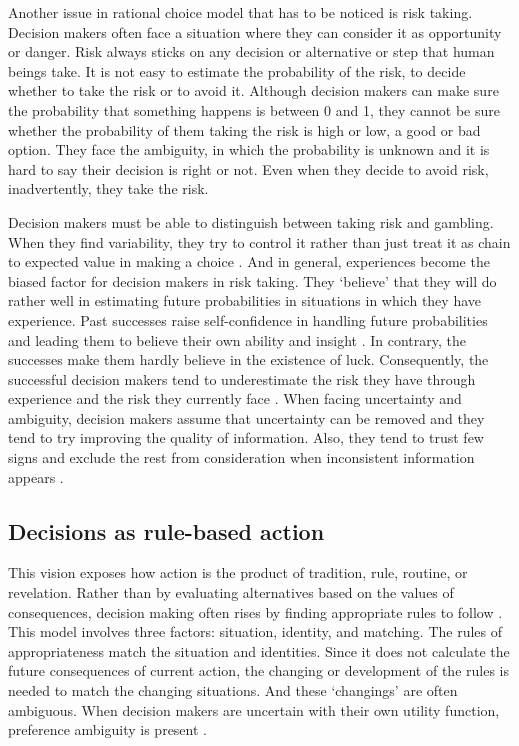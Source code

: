Another issue in rational choice model that has to be noticed is risk taking. Decision makers often face a situation where they can consider it as opportunity or danger. Risk always sticks on any decision or alternative or step that human beings take. It is not easy to estimate the probability of the risk, to decide whether to take the risk or to avoid it. Although decision makers can make sure the probability that something happens is between 0 and 1, they cannot be sure whether the probability of them taking the risk is high or low, a good or bad option. They face the ambiguity, in which the probability is unknown and it is hard to say their decision is right or not. Even when they decide to avoid risk, inadvertently, they take the risk.

Decision makers must be able to distinguish between taking risk and gambling. When they find variability, they try to control it rather than just treat it as chain to expected value in making a choice \cite{7}. And in general, experiences become the biased factor for decision makers in risk taking. They ‘believe’ that they will do rather well in estimating future probabilities in situations in which they have experience. Past successes raise self-confidence in handling future probabilities and leading them to believe their own ability and insight \cite{2}. In contrary, the successes make them hardly believe in the existence of luck. Consequently, the successful decision makers tend to underestimate the risk they have through experience and the risk they currently face \cite{7}. When facing uncertainty and ambiguity, decision makers assume that uncertainty can be removed and they tend to try improving the quality of information. Also, they tend to trust few signs and exclude the rest from consideration when inconsistent information appears \cite{8}.

\subsection{Decisions as rule-based action}

This vision exposes how action is the product of tradition, rule, routine, or revelation. Rather than by evaluating alternatives based on the values of consequences, decision making often rises by finding appropriate rules to follow \cite{2}. This model involves three factors: situation, identity, and matching. The rules of appropriateness match the situation and identities. Since it does not calculate the future consequences of current action, the changing or development of the rules is needed to match the changing situations. And these ‘changings’ are often ambiguous. When decision makers are uncertain with their own utility function, preference ambiguity is present \cite{9}.

